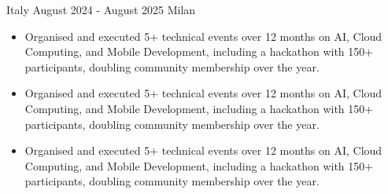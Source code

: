 {Italy}
{August 2024 - August 2025}
{Milan}
{\footnotesize\faCode \hspace{1pt}
}

\begin{itemize}

    \ifde
        \item Organised and executed 5+ technical events over 12 months on AI, Cloud Computing, and Mobile Development, including a hackathon with 150+ participants, doubling community membership over the year.
    \else
        \ifhpc
            \item Organised and executed 5+ technical events over 12 months on AI, Cloud Computing, and Mobile Development, including a hackathon with 150+ participants, doubling community membership over the year.
        \else
            \item Organised and executed 5+ technical events over 12 months on AI, Cloud Computing, and Mobile Development, including a hackathon with 150+ participants, doubling community membership over the year.
        \fi
    \fi

\end{itemize}

\medskip
